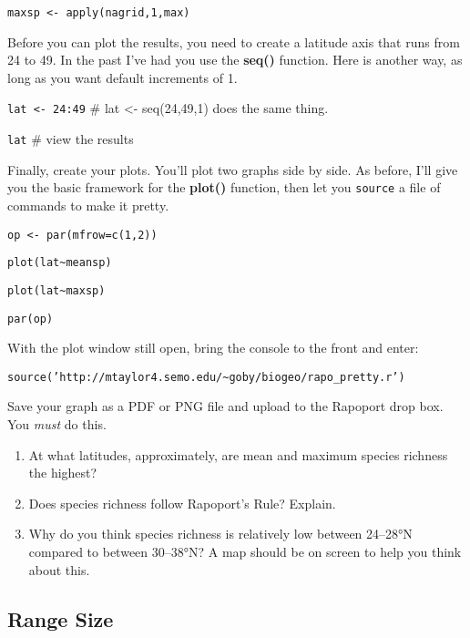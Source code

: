 \documentclass[11pt]{article}
\begin{document}
\texttt{maxsp \textless{}- apply(nagrid,1,max)}

Before you can plot the results, you need to create a latitude axis that
runs from 24 to 49. In the past I've had you use the \textbf{seq()}
function. Here is another way, as long as you want default increments of
1.

\texttt{lat \textless{}- 24:49}  \qquad \# lat \textless{}- seq(24,49,1) does the same thing.

\texttt{lat} \qquad \# view the results

Finally, create your plots. You'll plot two graphs side by side.
As before, I'll give you the basic framework for the \textbf{plot()} function,
then let you \texttt{source} a file of commands to make it pretty.

\texttt{op \textless{}- par(mfrow=c(1,2))} 

\texttt{plot(lat\textasciitilde{}meansp)}

\texttt{plot(lat\textasciitilde{}maxsp)}

\texttt{par(op)}

With the plot window still open, bring the console to the front and enter:

\texttt{source('http://mtaylor4.semo.edu/\textasciitilde{}goby/biogeo/rapo\_pretty.r')}

Save your graph as a PDF or PNG file and upload to the Rapoport drop box.
You \emph{must} do this.

\begin{enumerate}
	\item At what latitudes, approximately, are mean and maximum species richness the
highest? 

	\vspace{3\baselineskip}

	\item Does species richness follow Rapoport's Rule? Explain.

	\vspace{7\baselineskip}

	\item Why do you think species richness is relatively low between
24–28°N compared to between 30–38°N? A map should be on screen to help
you think about this.

\vspace{7\baselineskip}

\end{enumerate}

\subsection*{Range Size}
\end{document}
